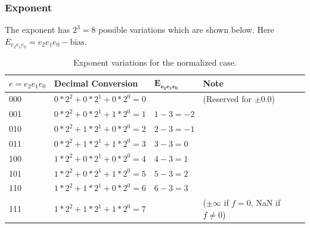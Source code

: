 \documentclass[12pt,letter]{article}
\begin{document}
\subsubsection{Exponent}
The exponent has $2^3=8$ possible variations which are shown below. Here $E_{e_2e_1e_0} = e_2e_1e_0 - \text{bias}$.
\begin{table}[h]
\centering
\begin{tabular}{l|l|l|l}
    $e=e_2e_1e_0$ & Decimal Conversion          & $\mathbf{E_{e_2e_1e_0}}$ & Note                                      \\ \hline
    000           & $0*2^2 + 0*2^1 + 0*2^0 = 0$ &                               & (Reserved for $\pm0.0$)                              \\
    001           & $0*2^2 + 0*2^1 + 1*2^0 = 1$ & $1-3=-2$                      &                                                      \\
    010           & $0*2^2 + 1*2^1 + 0*2^0 = 2$ & $2-3=-1$                      &                                                      \\
    011           & $0*2^2 + 1*2^1 + 1*2^0 = 3$ & $3-3=0$                       &                                                      \\
    100           & $1*2^2 + 0*2^1 + 0*2^0 = 4$ & $4-3=1$                       &                                                      \\
    101           & $1*2^2 + 0*2^1 + 1*2^0 = 5$ & $5-3=2$                       &                                                      \\
    110           & $1*2^2 + 1*2^1 + 0*2^0 = 6$ & $6-3=3$                       &                                                      \\
    111           & $1*2^2 + 1*2^1 + 1*2^0 = 7$ &                               & ($\pm \infty$ if $f=0$, NaN if $f\neq 0$)
\end{tabular}
\caption{\label{exp-norm} Exponent variations for the normalized case.}

\end{table}
\end{document}
